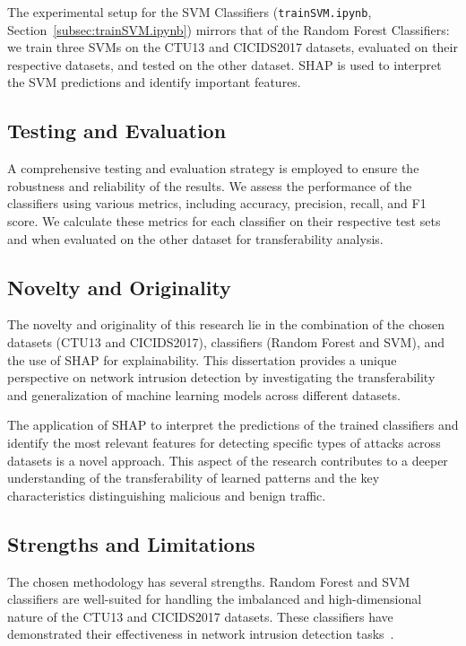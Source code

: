 The experimental setup for the SVM Classifiers (\texttt{trainSVM.ipynb}, Section~\ref{subsec:trainSVM.ipynb}) mirrors that of the Random Forest Classifiers: we train three SVMs on the CTU13 and CICIDS2017 datasets, evaluated on their respective datasets, and tested on the other dataset. SHAP is used to interpret the SVM predictions and identify important features.

\subsection{Testing and Evaluation}\label{subsec:testing-evaluation}
A comprehensive testing and evaluation strategy is employed to ensure the robustness and reliability of the results. We assess the performance of the classifiers using various metrics, including accuracy, precision, recall, and F1 score. We calculate these metrics for each classifier on their respective test sets and when evaluated on the other dataset for transferability analysis.

\subsection{Novelty and Originality}\label{subsec:novelty-originality}
The novelty and originality of this research lie in the combination of the chosen datasets (CTU13 and CICIDS2017), classifiers (Random Forest and SVM), and the use of SHAP for explainability. This dissertation provides a unique perspective on network intrusion detection by investigating the transferability and generalization of machine learning models across different datasets.

The application of SHAP to interpret the predictions of the trained classifiers and identify the most relevant features for detecting specific types of attacks across datasets is a novel approach. This aspect of the research contributes to a deeper understanding of the transferability of learned patterns and the key characteristics distinguishing malicious and benign traffic.

\subsection{Strengths and Limitations}\label{subsec:strengths-limitations}
The chosen methodology has several strengths. Random Forest and SVM classifiers are well-suited for handling the imbalanced and high-dimensional nature of the CTU13 and CICIDS2017 datasets. These classifiers have demonstrated their effectiveness in network intrusion detection tasks~\cite{farnaaz2016random, teng2017svm}.


